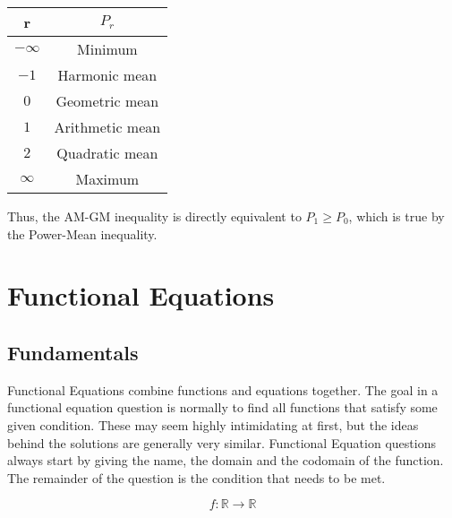 \documentclass[a4paper,12pt]{article}
\begin{document}
\begin{table}[]
    \centering
\begin{tabular}{|c|c|}
\hline
r                         & $P_r$            \\
\hline
$-\infty$                 & Minimum         \\
\hline
$-1$                      & Harmonic mean   \\
\hline
$0$                       & Geometric mean  \\
\hline
$1$                       & Arithmetic mean \\
\hline
$2$                       & Quadratic mean  \\
\hline
$\infty$                  & Maximum \\
\hline       
\end{tabular}
\end{table}

Thus, the AM-GM inequality is directly equivalent to $P_1 \geq P_0$, which is true by the Power-Mean inequality.

\section{Functional Equations}
\subsection{Fundamentals}
Functional Equations combine functions and equations together. The goal in a functional equation question is normally to find all functions that satisfy some given condition. These may seem highly intimidating at first, but the ideas behind the solutions are generally very similar.
Functional Equation questions always start by giving the name, the domain and the codomain of the function. The remainder of the question is the condition that needs to be met.

$$ f: \mathbb{R} \rightarrow \mathbb{R} $$
\end{document}
